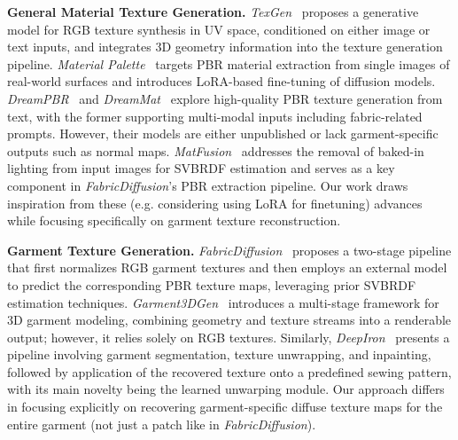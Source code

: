 \documentclass[11pt,twocolumn]{article}
\begin{document}
\textbf{General Material Texture Generation.} \textit{TexGen}~\cite{texgen} proposes a generative model for RGB texture synthesis in UV space, 
conditioned on either image or text inputs, and integrates 3D geometry information into the texture generation pipeline. 
\textit{Material Palette}~\cite{materialpalette} targets PBR material extraction from single images of 
real-world surfaces and introduces LoRA-based fine-tuning of diffusion models. 
\textit{DreamPBR}~\cite{dreampbr} and \textit{DreamMat}~\cite{dreammat} explore high-quality PBR texture generation from text, with the 
former supporting multi-modal inputs including fabric-related prompts. 
However, their models are either unpublished or lack garment-specific outputs such as normal maps. 
\textit{MatFusion}~\cite{matfusion} addresses the removal of baked-in lighting from input images for SVBRDF 
estimation and serves as a key component in \textit{FabricDiffusion}'s PBR extraction pipeline. Our work draws 
inspiration from these (e.g. considering using LoRA for finetuning) advances while focusing specifically on garment texture reconstruction.

\textbf{Garment Texture Generation.} \textit{FabricDiffusion}~\cite{fabricdiffusion} proposes a two-stage pipeline that first normalizes RGB garment textures 
and then employs an external model to predict the corresponding PBR texture maps, leveraging prior SVBRDF estimation techniques. 
\textit{Garment3DGen}~\cite{garment3dgen} introduces a multi-stage framework for 3D garment modeling, combining geometry and texture streams into a 
renderable output; however, it relies solely on RGB textures. Similarly, \textit{DeepIron}~\cite{deepiron} presents a pipeline involving garment segmentation, 
texture unwrapping, and inpainting, followed by application of the recovered texture onto a predefined sewing pattern, 
with its main novelty being the learned unwarping module. Our approach differs in focusing explicitly on recovering garment-specific diffuse texture maps for the 
entire garment (not just a patch like in \textit{FabricDiffusion}). 
\end{document}
